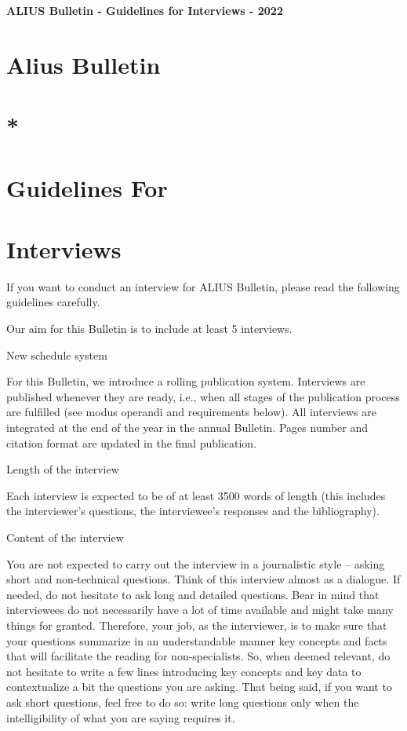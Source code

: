 \documentclass[11pt]{article}
\begin{document}
{\LARGE\bfseries ALIUS Bulletin - Guidelines for Interviews - 2022\par}
\vspace{1em}
\section*{Alius Bulletin}
\section*{*}
\section*{Guidelines For}
\section*{Interviews}
If you want to conduct an interview for ALIUS Bulletin, please read the following guidelines carefully.\par

Our aim for this Bulletin is to include at least 5 interviews.\par

New schedule system\par

For this Bulletin, we introduce a rolling publication system. Interviews are published whenever they are ready, i.e., when all stages of the publication process are fulfilled (see modus operandi and requirements below). All interviews are integrated at the end of the year in the annual Bulletin. Pages number and citation format are updated in the final publication.\par

Length of the interview\par

Each interview is expected to be of at least 3500 words of length (this includes the interviewer’s questions, the interviewee’s responses and the bibliography).\par

Content of the interview\par

You are not expected to carry out the interview in a journalistic style – asking short and non-technical questions. Think of this interview almost as a dialogue. If needed, do not hesitate to ask long and detailed questions. Bear in mind that interviewees do not necessarily have a lot of time available and might take many things for granted. Therefore, your job, as the interviewer, is to make sure that your questions summarize in an understandable manner key concepts and facts that will facilitate the reading for non-specialists. So, when deemed relevant, do not hesitate to write a few lines introducing key concepts and key data to contextualize a bit the questions you are asking. That being said, if you want to ask short questions, feel free to do so: write long questions only when the intelligibility of what you are saying requires it.\par
\end{document}
